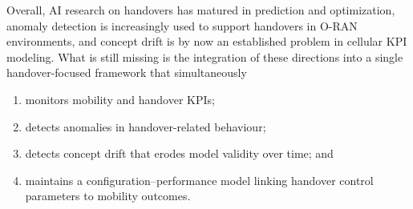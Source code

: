 Overall, AI research on handovers has matured in prediction and optimization,
anomaly detection is increasingly used to support handovers in O-RAN
environments, and concept drift is by now an established problem in cellular
KPI modeling. What is still missing is the integration of these directions
into a single handover-focused framework that simultaneously
\begin{enumerate}
  \item monitors mobility and handover KPIs;
  \item detects anomalies in handover-related behaviour;
  \item detects concept drift that erodes model validity over time; and
  \item maintains a configuration--performance model linking handover control
  parameters to mobility outcomes.
\end{enumerate}
